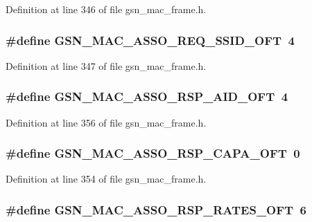 Definition at line 346 of file gsn\_\-mac\_\-frame.h.

\hypertarget{a00523_a229dd82bd517b5e92850ceeb67cb0789}{
\subsubsection[{GSN\_\-MAC\_\-ASSO\_\-REQ\_\-SSID\_\-OFT}]{\setlength{\rightskip}{0pt plus 5cm}\#define GSN\_\-MAC\_\-ASSO\_\-REQ\_\-SSID\_\-OFT~4}}
\label{a00523_a229dd82bd517b5e92850ceeb67cb0789}


Definition at line 347 of file gsn\_\-mac\_\-frame.h.

\hypertarget{a00523_a99d2508c6a186641966a723431784d01}{
\subsubsection[{GSN\_\-MAC\_\-ASSO\_\-RSP\_\-AID\_\-OFT}]{\setlength{\rightskip}{0pt plus 5cm}\#define GSN\_\-MAC\_\-ASSO\_\-RSP\_\-AID\_\-OFT~4}}
\label{a00523_a99d2508c6a186641966a723431784d01}


Definition at line 356 of file gsn\_\-mac\_\-frame.h.

\hypertarget{a00523_a92641f963f727de3c44093e4a0ffdca2}{
\subsubsection[{GSN\_\-MAC\_\-ASSO\_\-RSP\_\-CAPA\_\-OFT}]{\setlength{\rightskip}{0pt plus 5cm}\#define GSN\_\-MAC\_\-ASSO\_\-RSP\_\-CAPA\_\-OFT~0}}
\label{a00523_a92641f963f727de3c44093e4a0ffdca2}


Definition at line 354 of file gsn\_\-mac\_\-frame.h.

\hypertarget{a00523_a5f3fa9a82dcf1fdb9a4253367b2ce290}{
\subsubsection[{GSN\_\-MAC\_\-ASSO\_\-RSP\_\-RATES\_\-OFT}]{\setlength{\rightskip}{0pt plus 5cm}\#define GSN\_\-MAC\_\-ASSO\_\-RSP\_\-RATES\_\-OFT~6}}
\label{a00523_a5f3fa9a82dcf1fdb9a4253367b2ce290}


